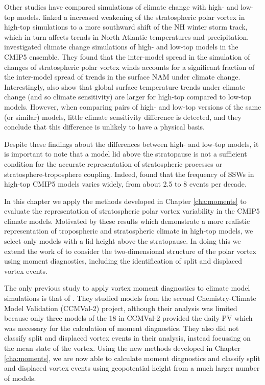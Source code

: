 Other studies have compared simulations of climate change with high- and low-top
models. \citet{Huebener2007} linked a increased weakening of the stratospheric
polar vortex in high-top simulations to a more southward shift of the NH winter
storm track, which in turn affects trends in North Atlantic temperatures and
precipitation. \citet{Manzini2014} investigated climate change simulations of
high- and low-top models in the CMIP5 ensemble. They found that the inter-model
spread in the simulation of changes of stratospheric polar vortex winds accounts
for a significant fraction of the inter-model spread of trends in the surface
NAM under climate change. Interestingly, \citet{Manzini2014} also show that
global surface temperature trends under climate change (and so climate
sensitivity) are larger for high-top compared to low-top models. However, when
comparing pairs of high- and low-top versions of the same (or similar) models,
little climate sensitivity difference is detected, and they conclude that this
difference is unlikely to have a physical basis.

Despite these findings about the differences between high- and low-top models,
it is important to note that a model lid above the stratopause is not a
sufficient condition for the accurate representation of stratospheric processes
or stratosphere-troposphere coupling. Indeed, \citet{Charlton-Perez2013} found
that the frequency of SSWs in high-top CMIP5 models varies widely, from about
2.5 to 8 events per decade. 

In this chapter we apply the methods developed in Chapter \ref{cha:moments} to
evaluate the representation of stratospheric polar vortex variability in
the CMIP5 climate models. Motivated by these results which demonstrate a more
realistic representation of tropospheric and stratospheric climate in high-top
models, we select only models with a lid height above the stratopause. In doing
this we extend the work of \citet{Charlton-Perez2013} to consider the
two-dimensional structure of the polar vortex using moment diagnostics,
including the identification of split and displaced vortex events.

The only previous study to apply vortex moment diagnostics to climate model
simulations is that of \citet{Mitchell2012a}. They studied models from the
second Chemistry-Climate Model Validation (CCMVal-2) project, although their
analysis was limited because only three models of the 18 in CCMVal-2 provided
the daily PV which was necessary for the calculation of moment diagnostics. They
also did not classify split and displaced vortex events in their analysis,
instead focussing on the mean state of the vortex. Using the new methods
developed in Chapter \ref{cha:moments}, we are now able to calculate moment
diagnostics and classify split and displaced vortex events using geopotential
height from a much larger number of models.

